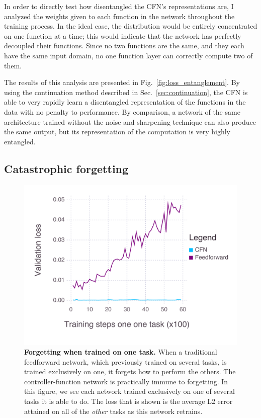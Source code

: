\documentclass[12pt,twoside]{mitthesis}
\begin{document}
In order to directly test how disentangled the CFN's representations
are, I analyzed the weights given to each function in the network
throughout the training process. In the ideal case, the distribution
would be entirely concentrated on one function at a time; this would
indicate that the network has perfectly decoupled their functions. Since
no two functions are the same, and they each have the same input domain,
no one function layer can correctly compute two of them.

The results of this analysis are presented in
Fig.~\ref{fig:loss_entanglement}. By using the continuation method
described in Sec.~\ref{sec:continuation}, the CFN is able to very
rapidly learn a disentangled representation of the functions in the data
with no penalty to performance. By comparison, a network of the same
architecture trained without the noise and sharpening technique can also
produce the same output, but its representation of the computation is
very highly entangled.

\subsection{Catastrophic forgetting}\label{catastrophic-forgetting-1}

\begin{figure}[htbp]
\centering
\includegraphics{../figures/forgetting.png}
\caption{\label{fig:forgetting}\textbf{Forgetting when trained on one
task.} When a traditional feedforward network, which previously trained
on several tasks, is trained exclusively on one, it forgets how to
perform the others. The controller-function network is practically
immune to forgetting. In this figure, we see each network trained
exclusively on one of several tasks it is able to do. The loss that is
shown is the average L2 error attained on all of the \emph{other} tasks
as this network retrains.}
\end{figure}
\end{document}
